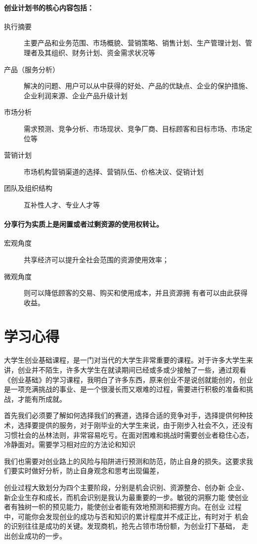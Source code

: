 \documentclass[UTF8]{article}
\begin{document}
\paragraph{创业计划书的核心内容包括：}
\begin{description}
\item [执行摘要]主要产品和业务范围、市场概貌、营销策略、销售计划、生产管理计划、管理者及其组织、财务计划、资金需求状况等
\item [产品（服务分析）]解决的问题、用户可以从中获得的好处、产品的优缺点、企业的保护措施、企业利润来源、企业产品升级计划
\item [市场分析] 需求预测、竞争分析、市场现状、竞争厂商、目标顾客和目标市场、市场定位等
\item [营销计划]市场机构营销渠道的选择、营销队伍、价格决议、促销计划
\item[团队及组织结构] 互补性人才、专业人才等
\end{description} 
\paragraph{分享行为实质上是闲置或者过剩资源的使用权转让。}
\begin{description}
 \item[宏观角度]共享经济可以提升全社会范围的资源使用效率；
 \item[微观角度]则可以降低顾客的交易、购买和使用成本，并且资源拥
有者可以由此获得收益。
\end{description}
\newpage
\section{学习心得}
大学生创业基础课程，是一门对当代的大学生非常重要的课程。对于许多大学生来讲，创业并不陌生，许多大学生在就读期间已经或多或少接触了一些，通过观看《创业基础》的学习课程，我明白了许多东西，原来创业不是说创就能创的，创业是一项充满挑战的事业、是一个很漫长而又艰难的过程，需要进行积极的准备和挑战，才能有所成就。

首先我们必须要了解如何选择我们的赛道，选择合适的竞争对手，选择提供何种技术，选择要提供的服务，对于刚毕业的大学生来说，由于刚步入社会不久，还没有习惯社会的丛林法则，非常容易吃亏。在面对困难和挑战时需要创业者稳住心态，冷静面对。需要学习相对应的方法论和知识

我们也需要对创业路上的风险与陷阱进行预测和防范，防止自身的损失。这要求我们要实时做好分析，防止自身观念和思考出现偏差，

创业过程大致划分为四个主要阶段，分别是机会识别、资源整合、创办新
企业、新企业生存和成长，而机会识别是我认为最重要的一步。敏锐的洞察力能
使创业者有独树一帜的预见能力，能使创业者能有效地预测和把握方向。在创业
过程中，可能你会发现创业的成功与否和知识的累计程度并不成正比，有时对于
机会的识别往往是成功的关键。发现商机，抢先占领市场份额，为创业打下基础，
走出创业成功的一步。 
\end{document}
